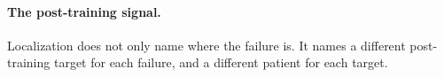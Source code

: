 
\paragraph{The post-training signal.}
Localization does not only name where the failure is. It names a different
post-training target for each failure, and a different patient for each target.

